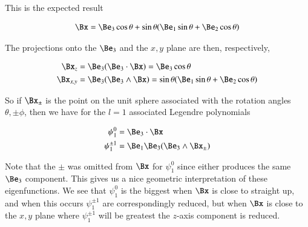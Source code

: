 This is the expected result

\begin{align}\label{eqn:L1Associated:foob4}
\Bx = \Be_3 \cos\theta + \sin\theta (\Be_1 \sin\theta + \Be_2 \cos\theta) 
\end{align}

The projections onto the $\Be_3$ and the $x,y$ plane are then, respectively,

\begin{align}\label{eqn:L1Associated:foob5}
\Bx_z &= \Be_3 (\Be_3 \cdot \Bx) = \Be_3 \cos\theta  \\
\Bx_{x,y} &= \Be_3 (\Be_3 \wedge \Bx) = \sin\theta (\Be_1 \sin\theta + \Be_2 \cos\theta) 
\end{align}

So if $\Bx_{\pm}$ is the point on the unit sphere associated with the rotation angles $\theta,\pm\phi$, then we have for the $l=1$ associated Legendre polynomials

\begin{align}\label{eqn:L1Associated:foob6}
\psi_1^0 &= \Be_3 \cdot \Bx \\
\psi_1^{\pm 1} &= \Be_1 \Be_3 (\Be_3 \wedge \Bx_{\pm})
\end{align}

Note that the $\pm$ was omitted from $\Bx$ for $\psi_1^0$ since either produces the same $\Be_3$ component.  This gives us a nice geometric interpretation of these eigenfunctions.  We see that $\psi_1^0$ is the biggest when $\Bx$ is close to straight up, and when this occurs $\psi_1^{\pm 1}$ are correspondingly reduced, but when $\Bx$ is close to the $x,y$ plane where $\psi_1^{\pm 1}$ will be greatest the $z$-axis component is reduced.

\EndArticle
